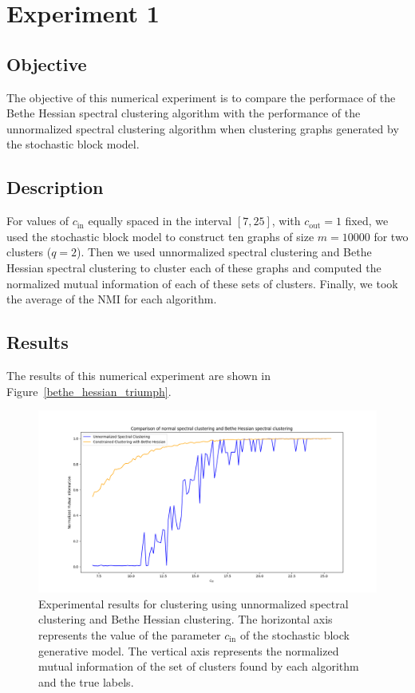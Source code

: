 \section{Experiment 1}
\subsection*{Objective}
The objective of this numerical experiment is to compare the performace of the Bethe Hessian spectral clustering algorithm with the performance of the unnormalized spectral clustering algorithm when clustering graphs generated by the stochastic block model.
\subsection*{Description}
For values of $c_\text{in}$ equally spaced in the interval $[7,25]$, with $c_\text{out} = 1$ fixed, we used the stochastic block model to construct ten graphs of size $m = 10000$ for two clusters ($q = 2$).
Then we used unnormalized spectral clustering and Bethe Hessian spectral clustering to cluster each of these graphs and computed the normalized mutual information of each of these sets of clusters.
Finally, we took the average of the NMI for each algorithm.

\subsection*{Results}
The results of this numerical experiment are shown in Figure~\vref{bethe_hessian_triumph}.

\begin{figure}[h]
\begin{center}
\includegraphics[width=16cm]{figures/bethe_hessian_triumph.png}
\end{center}
   \caption[Experimental results for clustering using unnormalized spectral clustering and Bethe Hessian clustering.]{Experimental results for clustering using unnormalized spectral clustering and Bethe Hessian clustering. The horizontal axis represents the value of the parameter $c_\text{in}$ of the stochastic block generative model. The vertical axis represents the normalized mutual information of the set of clusters found by each algorithm and the true labels.}
\label{bethe_hessian_triumph}
\end{figure}

